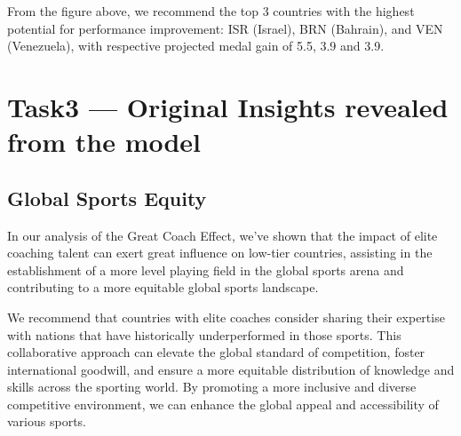 \documentclass{mcmthesis}
\begin{document}
From the figure above, we recommend the top 3 countries with the highest potential for performance improvement: ISR (Israel), BRN (Bahrain), and VEN (Venezuela), with respective projected medal gain of 5.5, 3.9 and 3.9.


\section{Task3 --- Original Insights revealed from the model}
\subsection{Global Sports Equity}
In our analysis of the Great Coach Effect, we've shown that the impact of elite coaching talent can exert great influence on low-tier countries, assisting in the establishment of a more level playing field in the global sports arena and contributing to a more equitable global sports landscape.

We recommend that countries with elite coaches consider sharing their expertise with nations that have historically underperformed in those sports. This collaborative approach can elevate the global standard of competition, foster international goodwill, and ensure a more equitable distribution of knowledge and skills across the sporting world. By promoting a more inclusive and diverse competitive environment, we can enhance the global appeal and accessibility of various sports.
\end{document}

